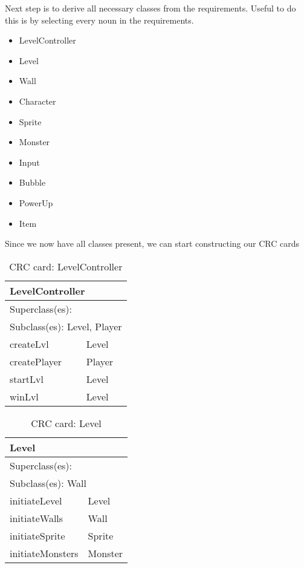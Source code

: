 Next step is to derive all necessary classes from the requirements. Useful to do this is by selecting every noun in the requirements. 
\begin{itemize}
    \item LevelController
    \item Level
    \item Wall
    \item Character
    \item Sprite
    \item Monster
    \item Input
    \item Bubble
    \item PowerUp
    \item Item
\end{itemize}

Since we now have all classes present, we can start constructing our CRC cards

\begin{table}[]
\centering
\label{crc_levelcontroller}
\begin{tabular}{|l|l|}
\hline
\multicolumn{2}{|l|}{LevelController} \\ \hline
\multicolumn{2}{|l|}{Superclass(es):} \\ \hline
\multicolumn{2}{|l|}{Subclass(es): Level, Player} \\ \hline
createLvl               & Level \\ \hline
createPlayer            & Player \\ \hline
startLvl                & Level \\ \hline
winLvl                  & Level \\ \hline
\end{tabular}
\caption{CRC card: LevelController}
\end{table}

\begin{table}[]
\centering
\label{crc_level}
\begin{tabular}{|l|l|}
\hline
\multicolumn{2}{|l|}{Level} \\ \hline
\multicolumn{2}{|l|}{Superclass(es):} \\ \hline
\multicolumn{2}{|l|}{Subclass(es): Wall} \\ \hline
initiateLevel           & Level \\ \hline
initiateWalls           & Wall \\ \hline
initiateSprite          & Sprite \\ \hline
initiateMonsters        & Monster \\ \hline
\end{tabular}
\caption{CRC card: Level}
\end{table}

